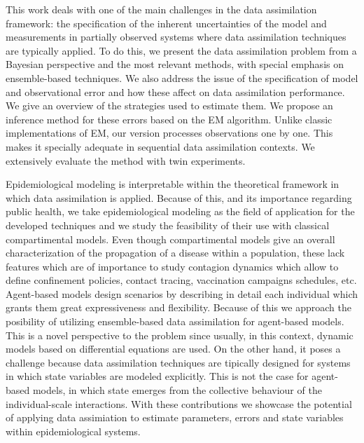 \documentclass[
11pt, %
spanish, %
singlespacing, %
toctotoc, %
headsepline, %
]{MastersDoctoralThesis} %
\begin{document}
\begin{extraAbstract}

    This work deals with one of the main challenges in the data assimilation framework: the specification of the inherent uncertainties of the model  and measurements in partially observed systems where data assimilation techniques are typically applied. To do this, we present the data assimilation problem from a Bayesian perspective and the most relevant methods, with special emphasis on ensemble-based techniques. We also address the issue of the specification of model and observational error and how these affect on data assimilation performance. We give an overview of the strategies used to estimate them. We propose an inference method for these errors based on the EM algorithm. Unlike classic implementations of EM, our version processes observations one by one. This makes it specially adequate in sequential data assimilation contexts. We extensively evaluate the method with twin experiments.

    Epidemiological modeling is interpretable within the theoretical framework in which data assimilation is applied. Because of this, and its importance regarding public health, we take epidemiological modeling as the field of application for the developed techniques and we study the feasibility of their use with classical compartimental models. Even though compartimental models give an overall characterization of the propagation of a disease within a population, these lack features which are of importance to study contagion dynamics which allow to define confinement policies, contact tracing, vaccination campaigns schedules, etc. Agent-based models design scenarios by describing in detail each individual which grants them great expressiveness and flexibility. Because of this we approach the posibility of utilizing ensemble-based data assimilation for agent-based models. This is a novel perspective to the problem since usually, in this context, dynamic models based on differential equations are used. On the other hand, it poses a challenge because data assimilation techniques are tipically designed for systems in which state variables are modeled explicitly. This is not the case for agent-based models, in which state emerges from the collective behaviour of the individual-scale interactions. With these contributions we showcase the potential of applying data assimiation to estimate parameters, errors and state variables within epidemiological systems.

\end{extraAbstract}
\end{document}
